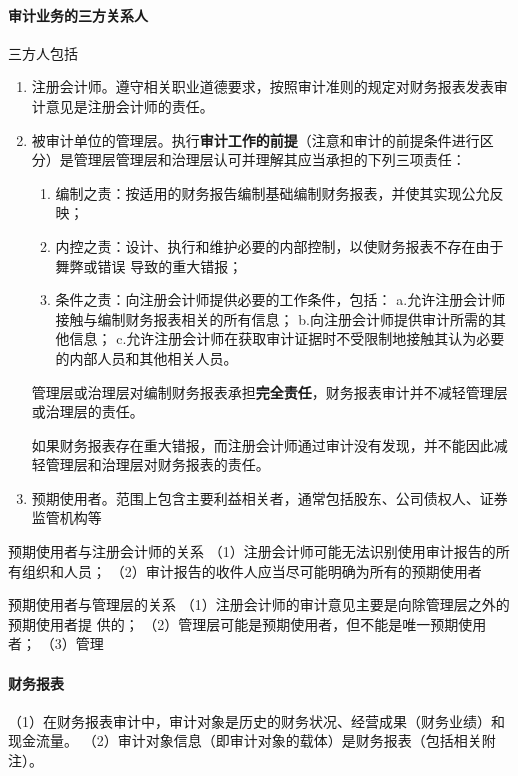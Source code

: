 \documentclass[UTF8,12pt]{ctexart}
\numberwithin{equation}{section} %
\numberwithin{figure}{section}
\numberwithin{table}{section}
\begin{document}
	\paragraph{审计业务的三方关系人}
	三方人包括
	\begin{enumerate}
		\item 注册会计师。遵守相关职业道德要求，按照审计准则的规定对财务报表发表审计意见是注册会计师的责任。
		
		\item 被审计单位的管理层。执行\textbf{审计工作的前提}（注意和审计的前提条件进行区分）是管理层管理层和治理层认可并理解其应当承担的下列三项责任：
		\begin{enumerate}
			\item 编制之责：按适用的财务报告编制基础编制财务报表，并使其实现公允反映；
			
			\item 内控之责：设计、执行和维护必要的内部控制，以使财务报表不存在由于舞弊或错误
			导致的重大错报；
			
			\item 条件之责：向注册会计师提供必要的工作条件，包括：
			a.允许注册会计师接触与编制财务报表相关的所有信息；
			b.向注册会计师提供审计所需的其他信息；
			c.允许注册会计师在获取审计证据时不受限制地接触其认为必要的内部人员和其他相关人员。
		\end{enumerate}
		
		管理层或治理层对编制财务报表承担\textbf{完全责任}，财务报表审计并不减轻管理层或治理层的责任。
		
		如果财务报表存在重大错报，而注册会计师通过审计没有发现，并不能因此减轻管理层和治理层对财务报表的责任。
		
		\item 预期使用者。范围上包含主要利益相关者，通常包括股东、公司债权人、证券监管机构等
	\end{enumerate}
	
	预期使用者与注册会计师的关系
	（1）注册会计师可能无法识别使用审计报告的所有组织和人员；
	（2）审计报告的收件人应当尽可能明确为所有的预期使用者
	
	预期使用者与管理层的关系
	（1）注册会计师的审计意见主要是向除管理层之外的预期使用者提
	供的；
	（2）管理层可能是预期使用者，但不能是唯一预期使用者；
	（3）管理
	\paragraph{财务报表}
	（1）在财务报表审计中，审计对象是历史的财务状况、经营成果（财务业绩）和现金流量。
	（2）审计对象信息（即审计对象的载体）是财务报表（包括相关附注）。
	
\end{document}
